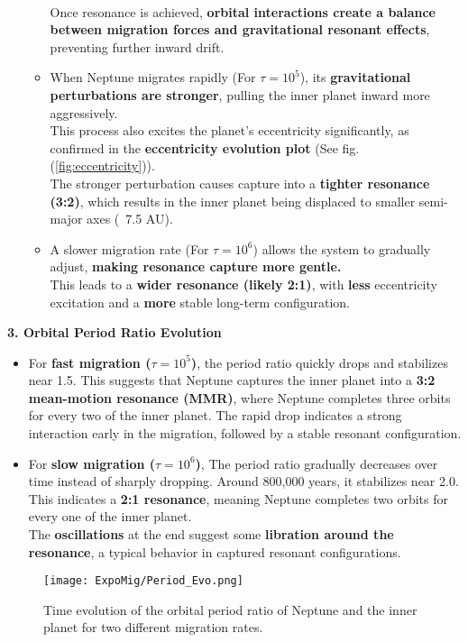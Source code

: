\documentclass[12pt,a4paper]{article}
\begin{document}
\begin{enumerate}
\begin{itemize}
      \\ Once resonance is achieved, \textbf{orbital interactions create a balance between migration forces and gravitational resonant effects}, preventing further inward drift.
      \item When Neptune migrates rapidly (For \(\tau = 10^5\)), its \textbf{gravitational perturbations are stronger}, pulling the inner planet inward more aggressively.
      \\ This process also excites the planet’s eccentricity significantly, as confirmed in the \textbf{eccentricity evolution plot} (See fig.(\ref{fig:eccentricity})).
      \\ The stronger perturbation causes capture into a \textbf{tighter resonance (3:2)}, which results in the inner planet being displaced to smaller semi-major axes (~7.5 AU).
      \item A slower migration rate (For \(\tau = 10^6\)) allows the system to gradually adjust, \textbf{making resonance capture more gentle.}
      \\ This leads to a \textbf{wider resonance (likely 2:1)}, with \textbf{less} eccentricity excitation and a \textbf{more} stable long-term configuration.
    \end{itemize}
\end{enumerate}

\textbf{3. Orbital Period Ratio Evolution}
\begin{itemize}
    \item For \textbf{fast migration (\(\tau = 10^5\))}, the period ratio quickly drops and stabilizes near 1.5. This suggests that Neptune captures the inner planet into a \textbf{3:2 mean-motion resonance (MMR)}, where Neptune completes three orbits for every two of the inner planet. The rapid drop indicates a strong interaction early in the migration, followed by a stable resonant configuration.
    \item For \textbf{slow migration (\(\tau = 10^6\))}, The period ratio gradually decreases over time instead of sharply dropping. Around 800,000 years, it stabilizes near 2.0.
    \\ This indicates a \textbf{2:1 resonance}, meaning Neptune completes two orbits for every one of the inner planet.
    \\ The \textbf{oscillations} at the end suggest some \textbf{libration around the resonance}, a typical behavior in captured resonant configurations.
\end{itemize}
\begin{figure}[h]
  \centering
  \texttt{[image: ExpoMig/Period\_Evo.png]}
  \caption{Time evolution of the orbital period ratio of Neptune and the inner planet for two different migration rates.}
  \label{fig:period_ratio}
\end{figure}
\end{document}
